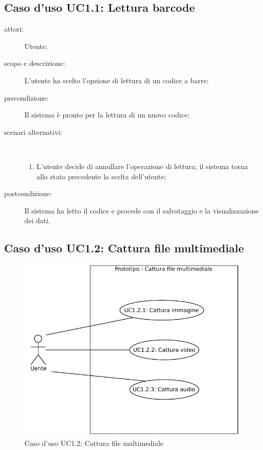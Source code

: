 \subsection{Caso d'uso UC1.1: Lettura barcode}
\begin{description}
\item[attori:] Utente;
\item[scopo e descrizione:] L'utente ha scelto l'opzione di lettura di un codice a barre;
\item[precondizione:] Il sistema è pronto per la lettura di un nuovo codice;
\item[scenari alternativi:] \hfill \\
	\begin{enumerate}
	\item L'utente decide di annullare l'operazione di lettura; il sistema torna allo stato precedente la scelta dell'utente;
	\end{enumerate}
\item[postcondizione:] Il sistema ha letto il codice e procede con il salvataggio e la visualizzazione dei dati.
\end{description}

\subsection{Caso d'uso UC1.2: Cattura file multimediale}
\begin{figure}[htb]
\centering
\includegraphics[scale=0.6]{gfx/useCase/UC1-2_Cattura_file_multimediale.pdf}
\caption{Caso d'uso UC1.2: Cattura file multimediale}
\label{fig:UC1.2}
\end{figure}

